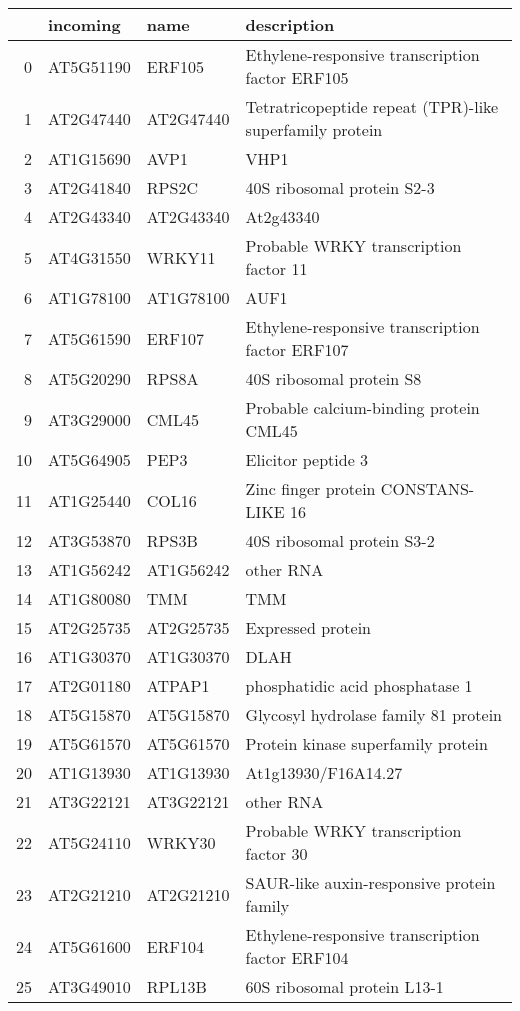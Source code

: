 \documentclass[a4paper]{article}
\begin{document}
\begin{center}
\begin{tabular}{rlll}
 & incoming & name & description\\
\hline
0 & AT5G51190 & ERF105 & Ethylene-responsive transcription factor ERF105\\
1 & AT2G47440 & AT2G47440 & Tetratricopeptide repeat (TPR)-like superfamily protein\\
2 & AT1G15690 & AVP1 & VHP1\\
3 & AT2G41840 & RPS2C & 40S ribosomal protein S2-3\\
4 & AT2G43340 & AT2G43340 & At2g43340\\
5 & AT4G31550 & WRKY11 & Probable WRKY transcription factor 11\\
6 & AT1G78100 & AT1G78100 & AUF1\\
7 & AT5G61590 & ERF107 & Ethylene-responsive transcription factor ERF107\\
8 & AT5G20290 & RPS8A & 40S ribosomal protein S8\\
9 & AT3G29000 & CML45 & Probable calcium-binding protein CML45\\
10 & AT5G64905 & PEP3 & Elicitor peptide 3\\
11 & AT1G25440 & COL16 & Zinc finger protein CONSTANS-LIKE 16\\
12 & AT3G53870 & RPS3B & 40S ribosomal protein S3-2\\
13 & AT1G56242 & AT1G56242 & other RNA\\
14 & AT1G80080 & TMM & TMM\\
15 & AT2G25735 & AT2G25735 & Expressed protein\\
16 & AT1G30370 & AT1G30370 & DLAH\\
17 & AT2G01180 & ATPAP1 & phosphatidic acid phosphatase 1\\
18 & AT5G15870 & AT5G15870 & Glycosyl hydrolase family 81 protein\\
19 & AT5G61570 & AT5G61570 & Protein kinase superfamily protein\\
20 & AT1G13930 & AT1G13930 & At1g13930/F16A14.27\\
21 & AT3G22121 & AT3G22121 & other RNA\\
22 & AT5G24110 & WRKY30 & Probable WRKY transcription factor 30\\
23 & AT2G21210 & AT2G21210 & SAUR-like auxin-responsive protein family\\
24 & AT5G61600 & ERF104 & Ethylene-responsive transcription factor ERF104\\
25 & AT3G49010 & RPL13B & 60S ribosomal protein L13-1\\

\end{tabular}
\end{center}
\end{document}
